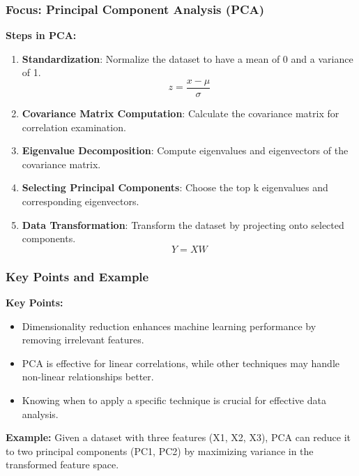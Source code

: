 \documentclass[aspectratio=169]{beamer}
\begin{document}
\begin{frame}[fragile]
    \frametitle{Focus: Principal Component Analysis (PCA)}
    
    \textbf{Steps in PCA:}
    \begin{enumerate}
        \item \textbf{Standardization}: Normalize the dataset to have a mean of 0 and a variance of 1.
        \begin{equation}
            z = \frac{x - \mu}{\sigma}
        \end{equation}

        \item \textbf{Covariance Matrix Computation}: Calculate the covariance matrix for correlation examination.

        \item \textbf{Eigenvalue Decomposition}: Compute eigenvalues and eigenvectors of the covariance matrix.

        \item \textbf{Selecting Principal Components}: Choose the top k eigenvalues and corresponding eigenvectors.

        \item \textbf{Data Transformation}: Transform the dataset by projecting onto selected components.
        \begin{equation}
            Y = XW
        \end{equation}
    \end{enumerate}
\end{frame}

\begin{frame}[fragile]
    \frametitle{Key Points and Example}
    
    \textbf{Key Points:}
    \begin{itemize}
        \item Dimensionality reduction enhances machine learning performance by removing irrelevant features.
        \item PCA is effective for linear correlations, while other techniques may handle non-linear relationships better.
        \item Knowing when to apply a specific technique is crucial for effective data analysis.
    \end{itemize}

    \textbf{Example:}
    Given a dataset with three features (X1, X2, X3), PCA can reduce it to two principal components (PC1, PC2) by maximizing variance in the transformed feature space.
\end{frame}
\end{document}
